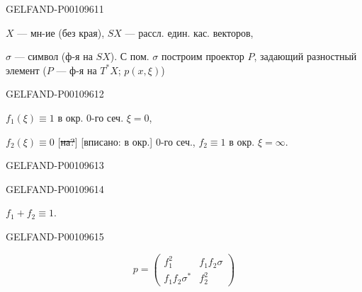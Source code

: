 \begin{GelfandAdjacentEvidence}{GELFAND-P001096}{11}



$X$ — мн-ие (без края), $SX$ — рассл. един. кас. векторов,

$\sigma$ — символ (ф-я на $SX$). С пом. $\sigma$ построим проектор $P$, задающий разностный элемент
($P$ — ф-я на $T^*X$; $p(x,\xi)$)

\end{GelfandAdjacentEvidence}
\begin{GelfandAdjacentEvidence}{GELFAND-P001096}{12}


$f_1(\xi)\equiv1$ в окр. 0-го сеч. $\xi=0$,

$f_2(\xi)\equiv0$ [\sout{на?}] [вписано: в окр.]
0-го сеч., $f_2\equiv1$ в окр. $\xi=\infty$.
\end{GelfandAdjacentEvidence}
\begin{GelfandAdjacentEvidence}{GELFAND-P001096}{13}

\end{GelfandAdjacentEvidence}
\begin{GelfandAdjacentEvidence}{GELFAND-P001096}{14}


$f_1+f_2\equiv1$.
\end{GelfandAdjacentEvidence}
\begin{GelfandAdjacentEvidence}{GELFAND-P001096}{15}

\[
p=\begin{pmatrix}
f_1^2&f_1f_2\sigma\\
f_1f_2\sigma^*&f_2^2
\end{pmatrix}
\]
\end{GelfandAdjacentEvidence}

